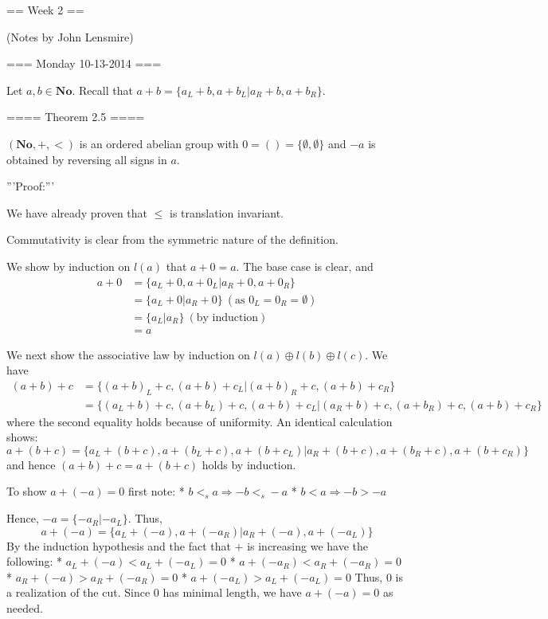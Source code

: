 == Week 2 ==

(Notes by John Lensmire)

=== Monday 10-13-2014 ===

Let $a,b\in \mathbf{No}$. Recall that $a + b = \{a_L + b, a + b_L | a_R + b, a + b_R \}$.

==== Theorem 2.5 ====

$(\mathbf{No},+,<)$ is an ordered abelian group with $0 = () = \{\emptyset, \emptyset \}$ and $-a$ is obtained by reversing all signs in $a$.

'''Proof:'''

We have already proven that $\leq$ is translation invariant.

Commutativity is clear from the symmetric nature of the definition.

We show by induction on $l(a)$ that $a+0 = a$. The base case is clear, and
\begin{align*}
a + 0 &= \{a_L + 0, a + 0_L | a_R + 0, a + 0_R \} \\
&= \{a_L + 0 | a_R + 0\} \ (\text{as } 0_L = 0_R = \emptyset) \\
&= \{a_L | a_R\} \ (\text{by induction}) \\
&= a
\end{align*}

We next show the associative law by induction on $l(a)\oplus l(b)\oplus l(c)$.
We have
\begin{align*}
(a+b)+c &= \{(a+b)_L + c, (a+b) + c_L | (a+b)_R + c, (a+b) + c_R \} \\
&= \{(a_L+b) + c, (a+b_L) + c, (a+b) + c_L | (a_R+b) + c, (a+b_R) + c, (a+b) + c_R\}
\end{align*}
where the second equality holds because of uniformity.
An identical calculation shows:
\[
a+(b+c) = \{a_L+ (b + c), a+ (b_L + c), a+ (b + c_L) | a_R+ (b + c), a+ (b_R + c), a+ (b + c_R)\}
\]
and hence $(a+b)+c = a+(b+c)$ holds by induction.

To show $a + (-a) = 0$ first note:
* $b <_s a \Rightarrow -b <_s -a$
* $b < a \Rightarrow -b > -a$

Hence, $-a = \{-a_R | -a_L\}$. Thus,
\[
a + (-a) = \{a_L + (-a), a + (-a_R) | a_R + (-a), a + (-a_L) \}
\]
By the induction hypothesis and the fact that $+$ is increasing we have the following:
* $a_L + (-a) < a_L + (-a_L) = 0$
* $a + (-a_R) < a_R + (-a_R) = 0$
* $a_R + (-a) > a_R + (-a_R) = 0$
* $a + (-a_L) > a_L + (-a_L) = 0$
Thus, $0$ is a realization of the cut. Since $0$ has minimal length, we have $a+(-a) = 0$ as needed.

